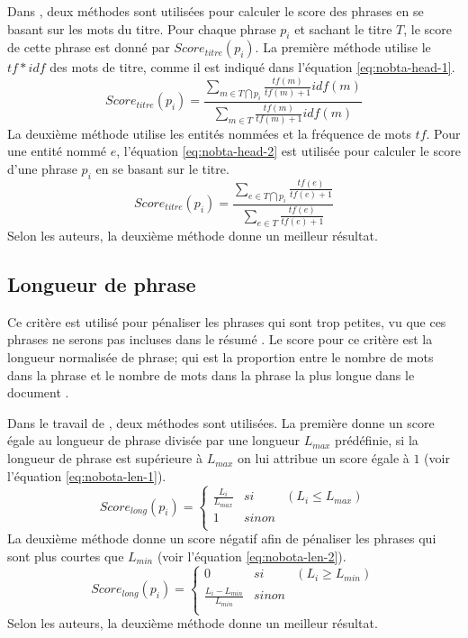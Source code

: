 \documentclass[a4paper,12pt,oneside]{../use/ESIthesis}
\begin{document}
Dans \cite{04-nobata-sekine}, deux méthodes sont utilisées pour calculer le score des phrases en se basant sur les mots du titre. 
Pour chaque phrase $ p_i $ et sachant le titre $ T $,  le score de cette phrase est donné par $ Score_{titre}(p_i) $. 
La première méthode utilise le $ tf*idf $ des mots de titre, comme il est indiqué dans l'équation \ref{eq:nobta-head-1}.
\begin{equation}
\label{eq:nobta-head-1}
Score_{titre}(p_i) = \frac{\sum_{m \in T \bigcap p_i}{\frac{tf(m)}{tf(m)+1} idf(m)}}
{\sum_{m \in T}{\frac{tf(m)}{tf(m)+1} idf(m)}}
\end{equation}
La deuxième méthode utilise les entités nommées et la fréquence de mots $ tf $. 
Pour une entité nommé $ e $, l'équation \ref{eq:nobta-head-2} est utilisée pour calculer le score d'une phrase $ p_i $ en se basant sur le titre.
\begin{equation}
\label{eq:nobta-head-2}
Score_{titre}(p_i) = \frac{\sum_{e \in T \bigcap p_i}{\frac{tf(e)}{tf(e)+1}}}
{\sum_{e \in T}{\frac{tf(e)}{tf(e)+1}}}
\end{equation}
Selon les auteurs, la deuxième méthode donne un meilleur résultat. 

\subsection{Longueur de phrase}

Ce critère est utilisé pour pénaliser les phrases qui sont trop petites, vu que ces phrases ne serons pas incluses dans le résumé \cite{95-kupiec-al}. 
Le score pour ce critère est la longueur normalisée de phrase; qui est la proportion entre le nombre de mots dans la phrase et le nombre de mots dans la phrase la plus longue dans le document \cite{02-neto-al,04-nobata-sekine}.

Dans le travail de \cite{04-nobata-sekine}, deux méthodes sont utilisées. 
La première donne un score égale au longueur de phrase divisée par une longueur $ L_{max} $ prédéfinie, si la longueur de phrase est supérieure à $ L_{max} $ on lui attribue un score égale à $ 1 $ (voir l'équation \ref{eq:nobota-len-1}). 
\begin{equation}
\label{eq:nobota-len-1}
Score_{long}(p_i) = \left\lbrace 
\begin{array}{lll}
\frac{L_i}{L_{max}} & si & (L_i \leq L_{max}) \\
1 & sinon & \\
\end{array}
\right. 
\end{equation}
La deuxième méthode donne un score négatif afin de pénaliser les phrases qui sont plus courtes que $ L_{min} $ (voir l'équation \ref{eq:nobota-len-2}). 
\begin{equation}
\label{eq:nobota-len-2}
Score_{long}(p_i) = \left\lbrace 
\begin{array}{lll}
0 & si & (L_i \geq L_{min}) \\
\frac{L_i - L_{min}}{L_{min}} & sinon & \\
\end{array}
\right. 
\end{equation}
Selon les auteurs, la deuxième méthode donne un meilleur résultat. 
\end{document}
